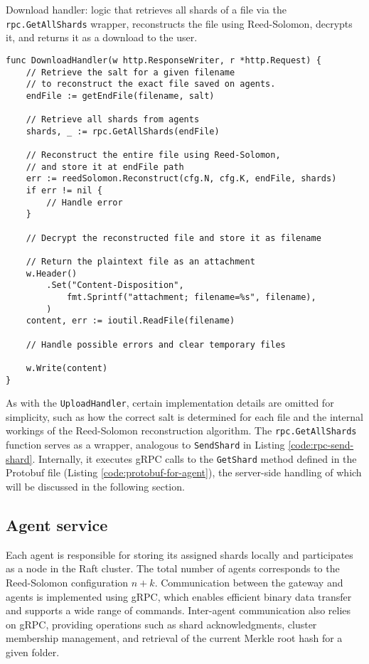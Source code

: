 \begin{listing}
\caption{Download handler: logic that retrieves all shards of a file via the \texttt{rpc.GetAllShards} wrapper, reconstructs the file using Reed-Solomon, decrypts it, and returns it as a download to the user.}
\label{code:download-handler}
\begin{verbatim}
func DownloadHandler(w http.ResponseWriter, r *http.Request) {
    // Retrieve the salt for a given filename 
    // to reconstruct the exact file saved on agents.
    endFile := getEndFile(filename, salt)

    // Retrieve all shards from agents
    shards, _ := rpc.GetAllShards(endFile)

    // Reconstruct the entire file using Reed-Solomon,
    // and store it at endFile path
    err := reedSolomon.Reconstruct(cfg.N, cfg.K, endFile, shards)
    if err != nil {
        // Handle error
    }

    // Decrypt the reconstructed file and store it as filename

    // Return the plaintext file as an attachment
    w.Header()
        .Set("Content-Disposition",
            fmt.Sprintf("attachment; filename=%s", filename),
        )
    content, err := ioutil.ReadFile(filename)

    // Handle possible errors and clear temporary files

    w.Write(content)
}
\end{verbatim}
\end{listing}

As with the \texttt{UploadHandler}, certain implementation details are omitted for simplicity, such as how the correct salt is determined for each file and the internal workings of the Reed-Solomon reconstruction algorithm. The \texttt{rpc.GetAllShards} function serves as a wrapper, analogous to \texttt{SendShard} in Listing \ref{code:rpc-send-shard}. Internally, it executes gRPC calls to the \texttt{GetShard} method defined in the Protobuf file (Listing \ref{code:protobuf-for-agent}), the server-side handling of which will be discussed in the following section.

\newpage

\subsection{Agent service}

Each agent is responsible for storing its assigned shards locally and participates as a node in the Raft cluster. The total number of agents corresponds to the Reed-Solomon configuration $n+k$. Communication between the gateway and agents is implemented using gRPC, which enables efficient binary data transfer and supports a wide range of commands. Inter-agent communication also relies on gRPC, providing operations such as shard acknowledgments, cluster membership management, and retrieval of the current Merkle root hash for a given folder.

